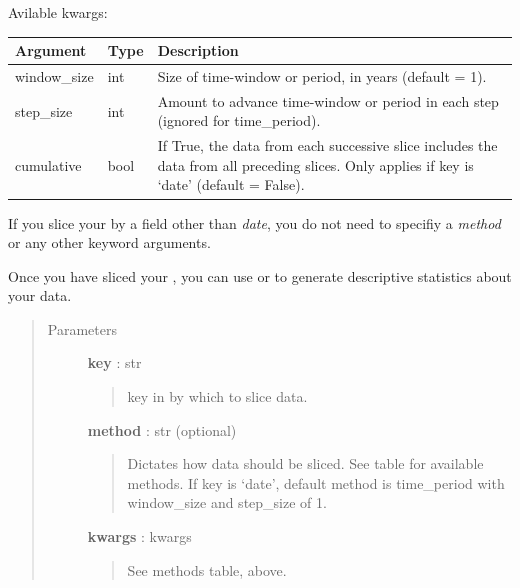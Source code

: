 \documentclass[letterpaper,10pt,english]{sphinxmanual}
\begin{document}
\begin{fulllineitems}
\begin{fulllineitems}
Avilable kwargs:

\begin{tabulary}{\linewidth}{|L|L|L|}
\hline
\textsf{\relax 
Argument
} & \textsf{\relax 
Type
} & \textsf{\relax 
Description
}\\
\hline
window\_size
 & 
int
 & 
Size of time-window or period, in years
(default = 1).
\\

step\_size
 & 
int
 & 
Amount to advance time-window or period in each
step (ignored for time\_period).
\\

cumulative
 & 
bool
 & 
If True, the data from each successive slice
includes the data from all preceding slices.
Only applies if key is `date' (default = False).
\\
\hline\end{tabulary}


If you slice your {\hyperref[tethne.classes.corpus:tethne.classes.corpus.Corpus]{}} by a field other than \emph{date}, you do
not need to specifiy a \emph{method} or any other keyword arguments.

Once you have sliced your {\hyperref[tethne.classes.corpus:tethne.classes.corpus.Corpus]{}}, you can use
 or  to generate
descriptive statistics about your data.
\begin{quote}\begin{description}
\item[{Parameters}] \leavevmode
\textbf{key} : str
\begin{quote}

key in {\hyperref[tethne.classes.paper:tethne.classes.paper.Paper]{}} by which to slice data.
\end{quote}

\textbf{method} : str (optional)
\begin{quote}

Dictates how data should be sliced. See table for available methods.
If key is `date', default method is time\_period with window\_size and
step\_size of 1.
\end{quote}

\textbf{kwargs} : kwargs
\begin{quote}

See methods table, above.
\end{quote}

\end{description}\end{quote}

\end{fulllineitems}
\end{fulllineitems}
\end{document}
